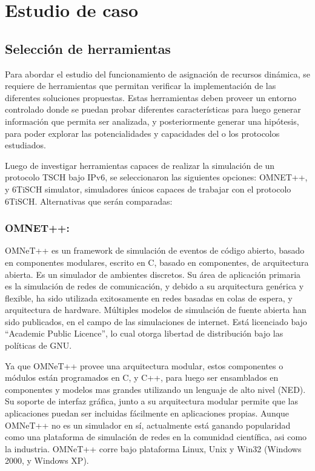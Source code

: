 \chapter[Tema]{Estudio de caso}
\label{ch:tema}




\section{Selección de herramientas}
Para abordar el estudio del funcionamiento de asignación de recursos dinámica, se requiere de herramientas que permitan verificar la implementación de las diferentes soluciones propuestas. Estas herramientas deben proveer un entorno controlado donde se puedan probar diferentes características para luego generar información que permita ser analizada, y posteriormente generar una hipótesis, para poder explorar las potencialidades y capacidades del o los protocolos estudiados.

Luego de investigar herramientas capaces de realizar la simulación de un protocolo TSCH bajo IPv6, se seleccionaron las siguientes opciones: OMNET++, y 6TiSCH simulator, simuladores únicos capaces de trabajar con el protocolo 6TiSCH. Alternativas que serán comparadas:


\subsection{OMNET++:}

OMNeT++ es un framework de simulación de eventos de código abierto, basado en componentes modulares, escrito en C, basado en componentes, de arquitectura abierta. Es un simulador de ambientes discretos. Su área de aplicación primaria es la simulación de redes de comunicación, y debido a su arquitectura genérica y flexible, ha sido utilizada exitosamente en redes basadas en colas de espera, y arquitectura de hardware. Múltiples modelos de simulación de fuente abierta han sido publicados, en el campo de las simulaciones de internet. Está licenciado bajo ``Academic Public Licence'', lo cual otorga libertad de distribución bajo las políticas de GNU.

Ya que OMNeT++ provee una arquitectura modular, estos componentes o módulos están programados en C, y C++, para luego ser ensamblados en componentes y modelos mas grandes utilizando un lenguaje de alto nivel (NED). Su soporte de interfaz gráfica, junto a su arquitectura modular permite que las aplicaciones puedan ser incluidas fácilmente en aplicaciones propias. Aunque OMNeT++ no es un simulador en sí, actualmente está ganando popularidad como una plataforma de simulación de redes en la comunidad científica, asi como la industria. OMNeT++ corre bajo plataforma Linux, Unix y Win32 (Windows 2000, y Windows XP).

